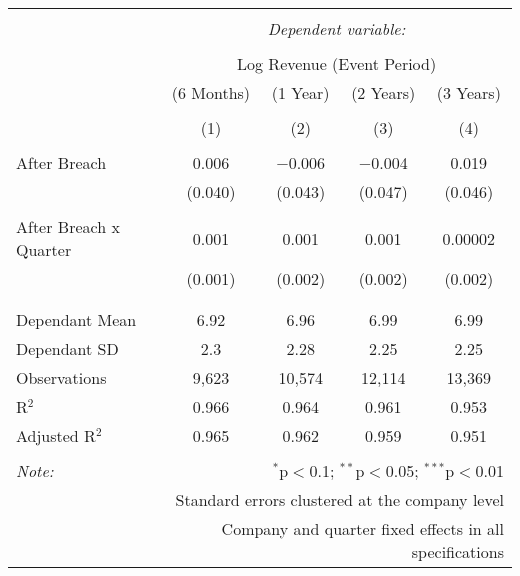 
\begin{table}[!htbp] \centering 
  \caption{} 
  \label{} 
\begin{tabular}{@{\extracolsep{5pt}}lcccc} 
\\[-1.8ex]\hline 
\hline \\[-1.8ex] 
 & \multicolumn{4}{c}{\textit{Dependent variable:}} \\ 
\cline{2-5} 
\\[-1.8ex] & \multicolumn{4}{c}{Log Revenue (Event Period)} \\ 
 & (6 Months) & (1 Year) & (2 Years) & (3 Years) \\ 
\\[-1.8ex] & (1) & (2) & (3) & (4)\\ 
\hline \\[-1.8ex] 
 After Breach & 0.006 & $-$0.006 & $-$0.004 & 0.019 \\ 
  & (0.040) & (0.043) & (0.047) & (0.046) \\ 
  & & & & \\ 
 After Breach x Quarter & 0.001 & 0.001 & 0.001 & 0.00002 \\ 
  & (0.001) & (0.002) & (0.002) & (0.002) \\ 
  & & & & \\ 
\hline \\[-1.8ex] 
Dependant Mean & 6.92 & 6.96 & 6.99 & 6.99 \\ 
Dependant SD & 2.3 & 2.28 & 2.25 & 2.25 \\ 
Observations & 9,623 & 10,574 & 12,114 & 13,369 \\ 
R$^{2}$ & 0.966 & 0.964 & 0.961 & 0.953 \\ 
Adjusted R$^{2}$ & 0.965 & 0.962 & 0.959 & 0.951 \\ 
\hline 
\hline \\[-1.8ex] 
\textit{Note:}  & \multicolumn{4}{r}{$^{*}$p$<$0.1; $^{**}$p$<$0.05; $^{***}$p$<$0.01} \\ 
 & \multicolumn{4}{r}{Standard errors clustered at the company level} \\ 
 & \multicolumn{4}{r}{Company and quarter fixed effects in all specifications} \\ 
\end{tabular} 
\end{table} 
